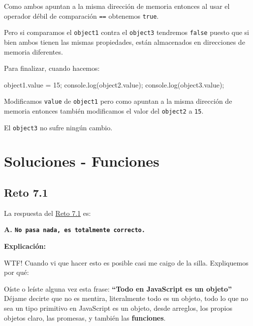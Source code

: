 \documentclass[
  letterpaper,
  DIV=11,
  numbers=noendperiod]{scrreprt}
\newenvironment{Shaded}{\begin{snugshade}}{\end{snugshade}}
\newcommand{\AttributeTok}[1]{\textcolor[rgb]{0.40,0.45,0.13}{#1}}
\newcommand{\BuiltInTok}[1]{\textcolor[rgb]{0.00,0.23,0.31}{#1}}
\newcommand{\DecValTok}[1]{\textcolor[rgb]{0.68,0.00,0.00}{#1}}
\newcommand{\FunctionTok}[1]{\textcolor[rgb]{0.28,0.35,0.67}{#1}}
\newcommand{\NormalTok}[1]{\textcolor[rgb]{0.00,0.23,0.31}{#1}}
\newcommand{\OperatorTok}[1]{\textcolor[rgb]{0.37,0.37,0.37}{#1}}
\begin{document}
Como ambos apuntan a la misma dirección de memoria entonces al usar el
operador débil de comparación \texttt{==} obtenemos \texttt{true}.

Pero si comparamos el \texttt{object1} contra el \texttt{object3}
tendremos \texttt{false} puesto que si bien ambos tienen las mismas
propiedades, están almacenados en direcciones de memoria diferentes.

Para finalizar, cuando hacemos:

\begin{Shaded}
\begin{Highlighting}[]
\NormalTok{object1}\OperatorTok{.}\AttributeTok{value} \OperatorTok{=} \DecValTok{15}\OperatorTok{;}
\BuiltInTok{console}\OperatorTok{.}\FunctionTok{log}\NormalTok{(object2}\OperatorTok{.}\AttributeTok{value}\NormalTok{)}\OperatorTok{;}
\BuiltInTok{console}\OperatorTok{.}\FunctionTok{log}\NormalTok{(object3}\OperatorTok{.}\AttributeTok{value}\NormalTok{)}\OperatorTok{;}
\end{Highlighting}
\end{Shaded}

Modificamos \texttt{value} de \texttt{object1} pero como apuntan a la
misma dirección de memoria entonces también modificamos el valor del
\texttt{object2} a \texttt{15}.

El \texttt{object3} no sufre ningún cambio.

\chapter{Soluciones - Funciones}\label{soluciones---funciones}

\section{Reto 7.1}\label{sec-sol-cap7-reto1}

La respuesta del \hyperref[sec-cap7-reto1]{Reto 7.1} es:

\textbf{A. \texttt{No\ pasa\ nada,\ es\ totalmente\ correcto.}}

\textbf{Explicación:}

WTF! Cuando vi que hacer esto es posible casi me caigo de la silla.
Expliquemos por qué:

Oíste o leíste alguna vez esta frase: \textbf{``Todo en JavaScript es un
objeto''} Déjame decirte que no es mentira, literalmente todo es un
objeto, todo lo que no sea un tipo primitivo en JavaScript es un objeto,
desde arreglos, los propios objetos claro, las promesas, y también las
\textbf{funciones}.
\end{document}
